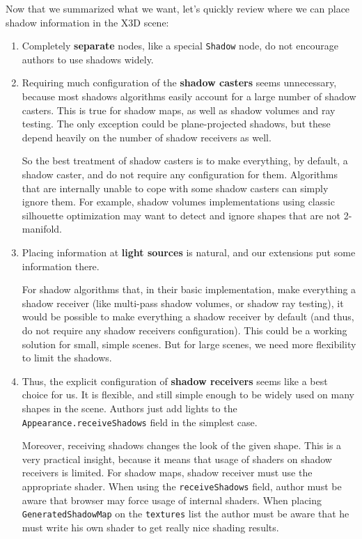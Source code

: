 \documentclass{acmsiggraph}                     %
\begin{document}
Now that we summarized what we want, let's quickly review where
we can place shadow information in the X3D scene:

\begin{enumerate}
\itemsep 0pt
\item Completely \textbf{separate} nodes, like a special \texttt{Shadow}
  node, do not encourage authors to use shadows widely.

\item Requiring much configuration of the \textbf{shadow casters}
  seems unnecessary, because most shadows algorithms easily account
  for a large number of shadow casters. This is true for shadow maps,
  as well as shadow volumes and ray testing. The only exception could
  be plane-projected shadows, but these depend heavily on the number
  of shadow receivers as well.

  So the best treatment of shadow casters is to make everything, by
  default, a shadow caster, and do not require any configuration for
  them. Algorithms that are internally unable to cope with some shadow
  casters can simply ignore them. For example, shadow volumes
  implementations using classic silhouette optimization may want to
  detect and ignore shapes that are not 2-manifold.

\item Placing information at \textbf{light sources} is natural, and
  our extensions put some information there.

  For shadow algorithms that, in their basic implementation,
  make everything a shadow receiver (like multi-pass shadow volumes,
  or shadow ray testing), it would be possible to make everything a
  shadow receiver by default (and thus, do not require any shadow
  receivers configuration). This could be a working solution for
  small, simple scenes. But for large scenes, we need more flexibility
  to limit the shadows.

\item Thus, the explicit configuration of \textbf{shadow receivers} seems
  like a best choice for us. It is flexible, and still simple enough
  to be widely used on many shapes in the scene. Authors just add
  lights to the \texttt{Appearance.receiveShadows} field in the
  simplest case.

  Moreover, receiving shadows changes the look of the given
  shape. This is a very practical insight, because it means that usage
  of shaders on shadow receivers is limited. For shadow maps, shadow
  receiver must use the appropriate shader. When using the
  \texttt{receiveShadows} field, author must be aware that browser may force
  usage of internal shaders. When placing
  \texttt{GeneratedShadowMap} on the \texttt{textures} list the author
  must be aware that he must write his own shader to
  get really nice shading results.

\end{enumerate}
\end{document}
